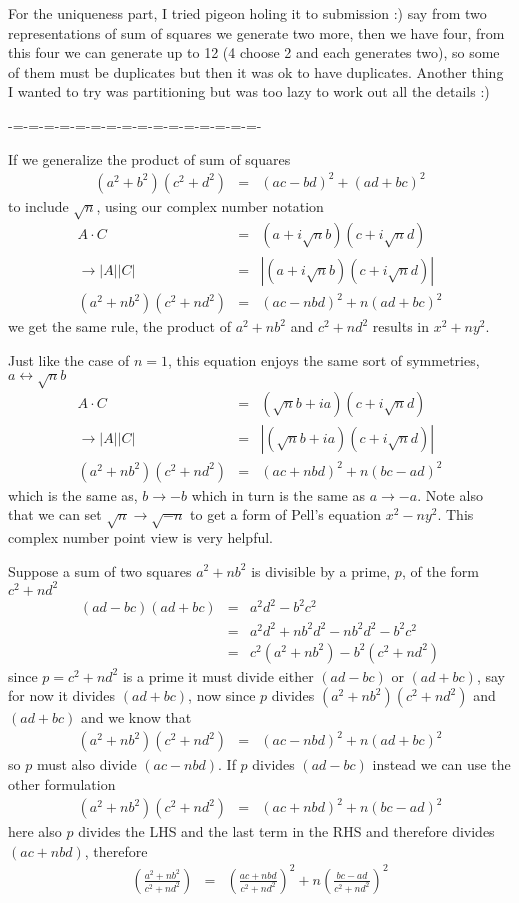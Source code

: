 \documentclass[aps,preprint,preprintnumbers,nofootinbib,showpacs,prd]{revtex4-1}
\newcommand{\nbea}{\begin{eqnarray*}}
\newcommand{\neea}{\end{eqnarray*}}
\begin{document}
For the uniqueness part, I tried pigeon holing it to submission :) say from two representations of sum of squares we generate two more, then we have four, from this four we can generate up to 12 (4 choose 2 and each generates two), so some of them must be duplicates but then it was ok to have duplicates. Another thing I wanted to try was partitioning but was too lazy to work out all the details :)





-=-=-=-=-=-=-=-=-=-=-=-=-=-=-=-=-

If we generalize the product of sum of squares
%
\nbea
(a^2 + b^2)(c^2 + d^2) & = & (ac - bd)^2 + (ad + bc)^2
\neea
%
to include $\sqrt{n}$, using our complex number notation
%
\nbea
A\cdot C & = & (a+i\sqrt{n}b)(c+i\sqrt{n}d) \\
\to |A||C| & = & |(a+i\sqrt{n}b)(c+i\sqrt{n}d)| \\
(a^2 + nb^2)(c^2 + nd^2) & = & (ac - nbd)^2 + n(ad + bc)^2
\neea
%
we get the same rule, the product of $a^2 + nb^2$ and $c^2 + nd^2$ results in $x^2 + ny^2$.

Just like the case of $n = 1$, this equation enjoys the same sort of symmetries, $a \leftrightarrow \sqrt{n}b$
%
\nbea
A\cdot C & = & (\sqrt{n}b + ia)(c+i\sqrt{n}d) \\
\to |A||C| & = & |(\sqrt{n}b + ia)(c+i\sqrt{n}d)| \\
(a^2 + nb^2)(c^2 + nd^2) & = & (ac + nbd)^2 + n(bc-ad)^2
\neea
%
which is the same as, $b \to -b$ which in turn is the same as $a \to -a$. Note also that we can set $\sqrt{n} \to \sqrt{-n}$ to get a form of Pell's equation $x^2 - n y^2$. This complex number point view is very helpful.

Suppose a sum of two squares $a^2 + nb^2$ is divisible by a prime, $p$, of the form $c^2  + nd^2$
%
\nbea
(ad - bc)(ad + bc) & = & a^2d^2 - b^2c^2 \\
& = & a^2d^2  + nb^2d^2 - nb^2d^2 - b^2c^2 \\
& = & c^2(a^2 + nb^2) - b^2(c^2 + nd^2) 
\neea
%
since $p = c^2 + nd^2$ is a prime it must divide either $(ad - bc)$ or $(ad + bc)$, say for now it divides $(ad + bc)$, now since $p$ divides $(a^2 + nb^2)(c^2 + nd^2)$ and $(ad + bc)$ and we know that
%
\nbea
(a^2 + nb^2)(c^2 + nd^2) & = & (ac - nbd)^2 + n(ad + bc)^2
\neea
%
so $p$ must also divide $(ac - nbd)$. If $p$ divides $(ad - bc)$ instead we can use the other formulation
%
\nbea
(a^2 + nb^2)(c^2 + nd^2) & = & (ac + nbd)^2 + n(bc-ad)^2
\neea
%
here also $p$ divides the LHS and the last term in the RHS and therefore divides $(ac + nbd)$, therefore
%
\nbea
\left(\frac{a^2 + nb^2}{c^2 + nd^2}\right) & = & \left(\frac{ac + nbd}{c^2 + nd^2}\right)^2 + n\left(\frac{bc-ad}{c^2 + nd^2}\right)^2
\neea
%
\end{document}
